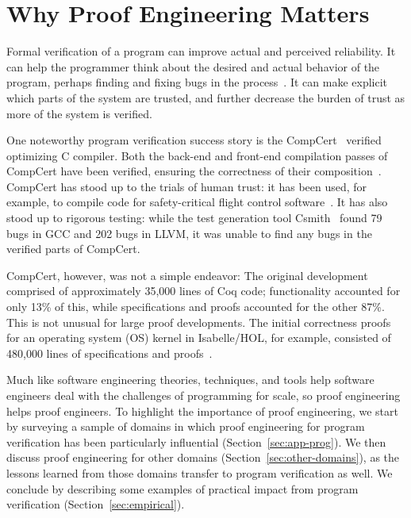 \chapter{Why Proof Engineering Matters}
\label{cha:appl-mech-proofs}

Formal verification of a program can improve actual and perceived reliability.
It can help the programmer think about the desired and actual behavior of the program,
perhaps finding and fixing bugs in the process~\citep{murraybp}.
It can make explicit which parts of the system are trusted, and further decrease the burden
of trust as more of the system is verified.

One noteworthy program verification success story is the CompCert~\citep{Leroy:POPL06, Leroy2009} verified optimizing C compiler.
Both the back-end and front-end compilation passes
of CompCert have been verified, ensuring the correctness of their composition~\citep{Kaestner2017}.
CompCert has stood up to the trials of human trust: it has been used, for example, to compile code for safety-critical flight control software~\citep{Frana2011}.
It has also stood up to rigorous testing: while the test generation tool Csmith~\citep{Yang2011} found 
79 bugs in GCC and 202 bugs in LLVM, it was unable to find any bugs in the verified parts of CompCert.

CompCert, however, was not a simple endeavor: The original development comprised of approximately 35,000 lines of Coq code;
functionality accounted for only 13\% of this, while specifications and proofs accounted for the other 87\%.
This is not unusual for large proof developments. The initial correctness proofs for an operating system (OS) kernel in Isabelle/HOL,
for example, consisted of 480,000 lines of specifications and proofs~\citep{Klein2014micro}.

Much like software engineering theories, techniques, and tools help software engineers deal with the challenges
of programming for scale, so proof engineering helps proof engineers.
To highlight the importance of proof engineering, we start by surveying a sample of domains in which 
proof engineering for program verification has been particularly influential (Section~\ref{sec:app-prog}).
We then discuss proof engineering for other domains (Section~\ref{sec:other-domains}),
as the lessons learned from those domains transfer to program verification as well.
We conclude by describing some examples of practical impact from program verification (Section~\ref{sec:empirical}).

